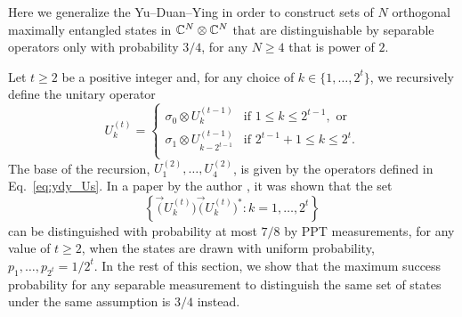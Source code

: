 Here we generalize the Yu--Duan--Ying in order to construct sets of $N$ orthogonal 
maximally entangled states in $\mathbb{C}^{N}\otimes\mathbb{C}^{N}$ that are distinguishable
by separable operators only with probability $3/4$, for any $N \geq 4$ that is power of $2$. 

Let $t \geq 2$ be a positive integer and, for any choice of $k \in \{ 1, \ldots, 2^{t}\}$,
we recursively define the unitary operator
\begin{equation}
\label{eq:construction}
  U_{k}^{(t)} =
    \begin{cases}
      \sigma_{0}\otimes U_{k}^{(t-1)} &\mbox{if } 1 \leq k \leq 2^{t-1}, \mbox{ or}\\
      \sigma_{1}\otimes U_{k-2^{t-1}}^{(t-1)} &\mbox{if } 2^{t-1} + 1 \leq k \leq 2^{t}.\\ 
    \end{cases}
\end{equation}
The base of the recursion, $U_{1}^{(2)}, \ldots, U_{4}^{(2)}$, 
is given by the operators defined in Eq.~\eqref{eq:ydy_Us}.
In a paper by the author \cite{Cosentino14}, it was shown that the set 
\begin{equation}
\label{eq:ydy_higher_dimension}
  \left\{ \vec(U_{k}^{(t)})\vec(U_{k}^{(t)})^{\ast} : k = 1, \ldots, 2^{t}\right\} 
\end{equation}
can be distinguished with probability at most $7/8$ by PPT measurements, 
for any value of $t \geq 2$, when the states are drawn with uniform probability, 
$p_{1}, \ldots, p_{2^{t}} = 1/2^{t}$.
In the rest of this section, we show that the maximum success probability for any separable 
measurement to distinguish the same set of states under the same assumption is $3/4$ instead.

